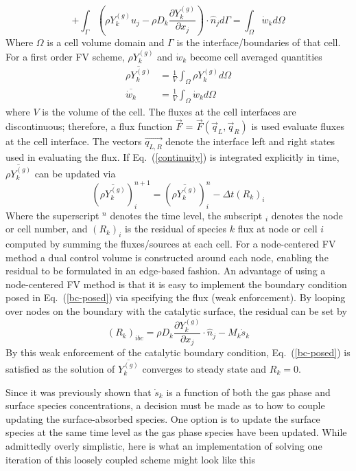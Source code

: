 \documentclass{report}
\newcommand{\eref}[1]{Eq.~(\ref{#1})}
\newcommand{\sk}{\dot{s}_k}
\newcommand{\wk}{\dot{w}_k}
\newcommand{\ry}{{\rho Y_{k}^{(g)}}}
\newcommand{\yk}{{Y_{k}^{(g)}}}
\newcommand{\dint}[1]{\int_{\Omega}{#1} d \Omega}
\newcommand{\fint}[1]{\int_{\Gamma}{#1} d \Gamma}
\newcommand{\flux}{\vec{F}}
\begin{document}
\begin{enumerate}[label=(\alph*)]
\begin{equation}
      + \fint{\left( \ry u_j - \rho D_k
        \frac{\partial Y_{k}^{(g)}}{\partial x_j}\right) \cdot \hat{n}_j }
      = \dint{\wk}
      \label{continuity}
    \end{equation}
    Where $\Omega$ is a cell volume domain and $\Gamma$ is the
    interface/boundaries of that cell.  For a first order FV scheme, $\ry$ and
    $\wk$ become cell averaged quantities
    \begin{align}
      \overline{\ry} &= \frac{1}{V}\dint{\ry} \\
      \overline{\wk} &= \frac{1}{V}\dint{\wk}
      \label{avg-q}
    \end{align}
    where $V$ is the volume of the cell. The fluxes at the cell interfaces are
    discontinuous; therefore, a flux function $\flux$ = $\flux (\vec{q}_L,
    \vec{q}_R)$ is used evaluate fluxes at the cell interface.  The vectors
    $\vec{q_{L,R}}$ denote the interface left and right states used in
    evaluating the flux. If \eref{continuity} is integrated explicitly in time,
    $\overline{\ry}$ can be updated via
    \begin{equation}
      (\overline{\ry})_{i}^{n+1} = (\overline{\ry})^{n}_i - \Delta t (R_k)_i
      \label{expl-fv}
    \end{equation}
    Where the superscript $^n$ denotes the time level, the subscript $_i$
    denotes the node or cell number, and $(R_k)_i$ is the residual of species
    $k$ flux at node or cell $i$ computed by summing the fluxes/sources at each
    cell.  For a node-centered FV method a dual control volume is constructed
    around each node, enabling the residual to be formulated in an edge-based
    fashion.  An advantage of using a node-centered FV method is that it is
    easy to implement the boundary condition posed in \eref{bc-posed} via
    specifying the flux (weak enforcement).  By looping over nodes on the
    boundary with the catalytic surface, the residual can be set by
    \begin{equation}
      (R_k)_{ibc} = \rho D_k \frac{\partial Y_k^{(g)}}{\partial x_j} \cdot \hat{n}_j
      - M_k \sk
      \label{res-bc}
    \end{equation}
    By this weak enforcement of the catalytic boundary condition,
    \eref{bc-posed} is satisfied as the solution of $\overline{\yk}$ converges
    to steady state and $R_k = 0$.

    Since it was previously shown that $\sk$ is a
    function of both the gas phase and surface species concentrations, a
    decision must be made as to how to couple updating the surface-absorbed
    species.  One option is to update the surface species at the same time
    level as the gas phase species have been updated.  While admittedly overly
    simplistic, here is what an implementation of solving one iteration of this
    loosely coupled scheme might look like this


\end{enumerate}
\end{document}
